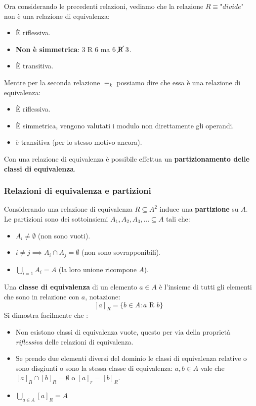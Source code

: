 \documentclass{article}
\begin{document}
Ora considerando le precedenti relazioni, vediamo che la relazione $R\equiv\textit{"divide"}$
non è una relazione di equivalenza:
\begin{itemize}
    \item È riflessiva.
    \item \textbf{Non è simmetrica}: $3\text{ R }6$ ma $6\text{ \cancel{R} }3$.
    \item È transitiva.
\end{itemize}
Mentre per la seconda relazione $\equiv_k$ possiamo dire che essa è una
relazione di equivalenza:
\begin{itemize}
    \item È riflessiva.
    \item È simmetrica, vengono valutati i modulo non direttamente gli operandi.
    \item è transitiva (per lo stesso motivo ancora).
\end{itemize}
Con una relazione di equivalenza è possibile effettua un \textbf{partizionamento
    delle classi di equivalenza}.
\subsubsection{Relazioni di equivalenza e partizioni}
Considerando una relazione di equivalenza $R\subseteq A^2$ induce una
\textbf{partizione} su $A$.
Le partizioni sono dei sottoinsiemi $A_1,A_2,A_3,...\subseteq A$ tali che:
\begin{itemize}
    \item $A_i\neq\emptyset$ (non sono vuoti).
    \item $i\neq j\implies A_i \cap A_j =\emptyset$ (non sono sovrapponibili).
    \item $\bigcup\limits_{i=1} A_i=A$ (la loro unione ricompone $A$).
\end{itemize}

Una \textbf{classe di equivalenza} di un elemento $a\in A$ è l'insieme di tutti
gli elementi che sono in relazione con $a$, notazione:
$$[a]_R=\{b\in A: a\text{ R }b\}$$
Si dimostra facilmente che :
\begin{itemize}
    \item Non esistono classi di equivalenza vuote, questo per via della proprietà
          \textit{riflessiva} delle relazioni di equivalenza.
    \item Se prendo due elementi diversi del dominio le classi di equivalenza relative
          o sono disgiunti o sono la stessa classe di equivalenza: $a,b\in A$ vale che
          $[a]_R\cap[b]_R=\emptyset$ o $[a]_r = [b]_R$.
    \item $\bigcup\limits_{a\in A}[a]_R=A$
\end{itemize}
\end{document}
